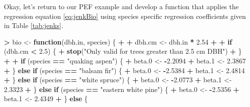 \documentclass[]{krantz}
\makeatletter
\newenvironment{Shaded}{\begin{snugshade}}{\end{snugshade}}
\newcommand{\KeywordTok}[1]{\textcolor[rgb]{0.27,0.27,0.27}{\textbf{#1}}}
\newcommand{\DecValTok}[1]{\textcolor[rgb]{0.06,0.06,0.06}{#1}}
\newcommand{\FloatTok}[1]{\textcolor[rgb]{0.06,0.06,0.06}{#1}}
\newcommand{\StringTok}[1]{\textcolor[rgb]{0.5,0.5,0.5}{#1}}
\newcommand{\ControlFlowTok}[1]{\textcolor[rgb]{0.27,0.27,0.27}{\textbf{#1}}}
\newcommand{\OperatorTok}[1]{\textcolor[rgb]{0.43,0.43,0.43}{\textbf{#1}}}
\newcommand{\NormalTok}[1]{#1}
\newenvironment{kframe}{%
\medskip{}
\setlength{\fboxsep}{.8em}
 \def\at@end@of@kframe{}%
 \ifinner\ifhmode%
  \def\at@end@of@kframe{\end{minipage}}%
  \begin{minipage}{\columnwidth}%
 \fi\fi%
 \def\FrameCommand##1{\hskip\@totalleftmargin \hskip-\fboxsep
 \colorbox{shadecolor}{##1}\hskip-\fboxsep
     \hskip-\linewidth \hskip-\@totalleftmargin \hskip\columnwidth}%
 \MakeFramed {\advance\hsize-\width
   \@totalleftmargin\z@ \linewidth\hsize
   \@setminipage}}%
 {\par\unskip\endMakeFramed%
 \at@end@of@kframe}
\renewenvironment{Shaded}{\begin{kframe}}{\end{kframe}}
\theoremstyle{definition}
\theoremstyle{definition}
\theoremstyle{definition}
\theoremstyle{remark}
\makeatother
\begin{document}
Okay, let's return to our PEF example and develop a function that
applies the regression equation \eqref{eq:jenkBio} using species specific
regression coefficients given in Table \ref{tab:jenks}.

\begin{Shaded}
\begin{Highlighting}[]
\OperatorTok{>}\StringTok{ }\NormalTok{bio <-}\StringTok{ }\ControlFlowTok{function}\NormalTok{(dbh.in, species) \{}
\OperatorTok{+}\StringTok{   }
\OperatorTok{+}\StringTok{   }\NormalTok{dbh.cm <-}\StringTok{ }\NormalTok{dbh.in }\OperatorTok{*}\StringTok{ }\FloatTok{2.54}
\OperatorTok{+}\StringTok{   }
\OperatorTok{+}\StringTok{   }\ControlFlowTok{if}\NormalTok{ (dbh.cm }\OperatorTok{<}\StringTok{ }\FloatTok{2.5}\NormalTok{) \{}
\OperatorTok{+}\StringTok{     }\KeywordTok{stop}\NormalTok{(}\StringTok{"Only valid for trees greater than 2.5 cm DBH"}\NormalTok{)}
\OperatorTok{+}\StringTok{   }\NormalTok{\}}
\OperatorTok{+}\StringTok{   }
\OperatorTok{+}\StringTok{   }\ControlFlowTok{if}\NormalTok{ (species }\OperatorTok{==}\StringTok{ "quaking aspen"}\NormalTok{) \{}
\OperatorTok{+}\StringTok{     }\NormalTok{beta.}\DecValTok{0}\NormalTok{ <-}\StringTok{ }\OperatorTok{-}\FloatTok{2.2094}
\OperatorTok{+}\StringTok{     }\NormalTok{beta.}\DecValTok{1}\NormalTok{ <-}\StringTok{ }\FloatTok{2.3867}
\OperatorTok{+}\StringTok{   }\NormalTok{\} }\ControlFlowTok{else} \ControlFlowTok{if}\NormalTok{ (species }\OperatorTok{==}\StringTok{ "balsam fir"}\NormalTok{) \{}
\OperatorTok{+}\StringTok{     }\NormalTok{beta.}\DecValTok{0}\NormalTok{ <-}\StringTok{ }\OperatorTok{-}\FloatTok{2.5384}
\OperatorTok{+}\StringTok{     }\NormalTok{beta.}\DecValTok{1}\NormalTok{ <-}\StringTok{ }\FloatTok{2.4814}
\OperatorTok{+}\StringTok{   }\NormalTok{\} }\ControlFlowTok{else} \ControlFlowTok{if}\NormalTok{ (species }\OperatorTok{==}\StringTok{ "white spruce"}\NormalTok{) \{}
\OperatorTok{+}\StringTok{     }\NormalTok{beta.}\DecValTok{0}\NormalTok{ <-}\StringTok{ }\OperatorTok{-}\FloatTok{2.0773}
\OperatorTok{+}\StringTok{     }\NormalTok{beta.}\DecValTok{1}\NormalTok{ <-}\StringTok{ }\FloatTok{2.3323}
\OperatorTok{+}\StringTok{   }\NormalTok{\} }\ControlFlowTok{else} \ControlFlowTok{if}\NormalTok{ (species }\OperatorTok{==}\StringTok{ "eastern white pine"}\NormalTok{) \{}
\OperatorTok{+}\StringTok{     }\NormalTok{beta.}\DecValTok{0}\NormalTok{ <-}\StringTok{ }\OperatorTok{-}\FloatTok{2.5356}
\OperatorTok{+}\StringTok{     }\NormalTok{beta.}\DecValTok{1}\NormalTok{ <-}\StringTok{ }\FloatTok{2.4349}
\OperatorTok{+}\StringTok{   }\NormalTok{\} }\ControlFlowTok{else}\NormalTok{ \{}

\end{Highlighting}
\end{Shaded}
\end{document}
